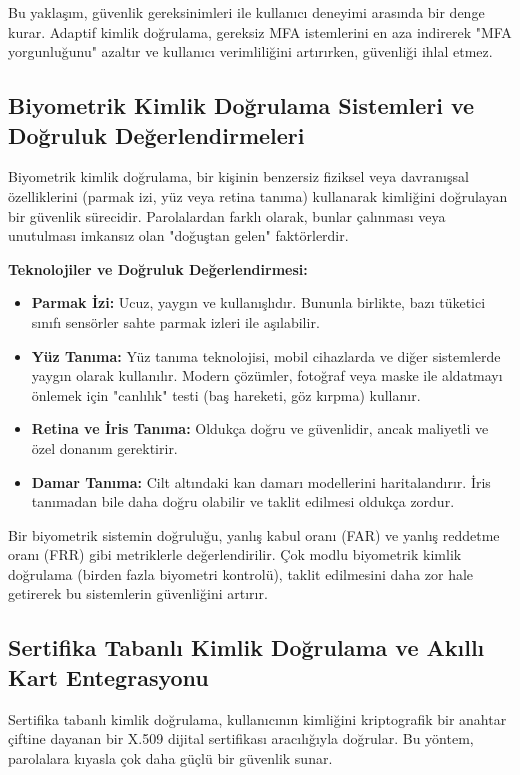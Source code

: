 Bu yaklaşım, güvenlik gereksinimleri ile kullanıcı deneyimi arasında bir denge kurar. Adaptif kimlik doğrulama, gereksiz MFA istemlerini en aza indirerek "MFA yorgunluğunu" azaltır ve kullanıcı verimliliğini artırırken, güvenliği ihlal etmez.

\subsection{Biyometrik Kimlik Doğrulama Sistemleri ve Doğruluk Değerlendirmeleri}

Biyometrik kimlik doğrulama, bir kişinin benzersiz fiziksel veya davranışsal özelliklerini (parmak izi, yüz veya retina tanıma) kullanarak kimliğini doğrulayan bir güvenlik sürecidir. Parolalardan farklı olarak, bunlar çalınması veya unutulması imkansız olan "doğuştan gelen" faktörlerdir.

\textbf{Teknolojiler ve Doğruluk Değerlendirmesi:}
\begin{itemize}
    \item \textbf{Parmak İzi:} Ucuz, yaygın ve kullanışlıdır. Bununla birlikte, bazı tüketici sınıfı sensörler sahte parmak izleri ile aşılabilir.
    \item \textbf{Yüz Tanıma:} Yüz tanıma teknolojisi, mobil cihazlarda ve diğer sistemlerde yaygın olarak kullanılır. Modern çözümler, fotoğraf veya maske ile aldatmayı önlemek için "canlılık" testi (baş hareketi, göz kırpma) kullanır.
    \item \textbf{Retina ve İris Tanıma:} Oldukça doğru ve güvenlidir, ancak maliyetli ve özel donanım gerektirir.
    \item \textbf{Damar Tanıma:} Cilt altındaki kan damarı modellerini haritalandırır. İris tanımadan bile daha doğru olabilir ve taklit edilmesi oldukça zordur.
\end{itemize}

Bir biyometrik sistemin doğruluğu, yanlış kabul oranı (FAR) ve yanlış reddetme oranı (FRR) gibi metriklerle değerlendirilir. Çok modlu biyometrik kimlik doğrulama (birden fazla biyometri kontrolü), taklit edilmesini daha zor hale getirerek bu sistemlerin güvenliğini artırır.

\subsection{Sertifika Tabanlı Kimlik Doğrulama ve Akıllı Kart Entegrasyonu}

Sertifika tabanlı kimlik doğrulama, kullanıcının kimliğini kriptografik bir anahtar çiftine dayanan bir X.509 dijital sertifikası aracılığıyla doğrular. Bu yöntem, parolalara kıyasla çok daha güçlü bir güvenlik sunar.

